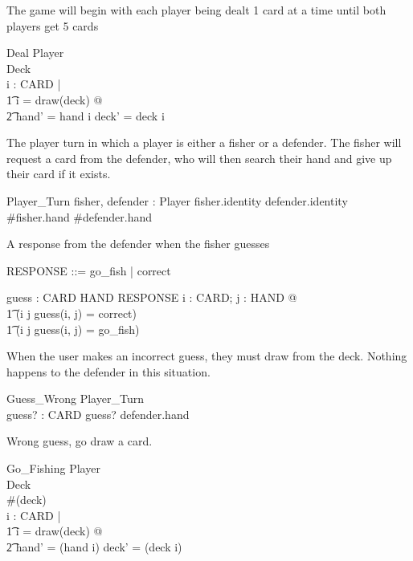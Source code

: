 \documentclass{article}
\begin{document}
The game will begin with each player being dealt 1 card at a time
until both players get 5 cards
\begin{schema}{Deal}
    \Delta Player \\
    \Delta Deck \\
    \where
    \forall i : \power CARD | \\
    \t1 i = draw(deck) @ \\
    \t2 hand' = hand \cup i \land deck' = deck \setminus i
\end{schema}

The player turn in which a player is either a fisher
or a defender. The fisher will request a card from the defender,
who will then search their hand and give up their card if it exists.
\begin{schema}{Player\_Turn}
    fisher, defender : Player
    \where
    fisher.identity \neq defender.identity\\
    \#fisher.hand  \land \#defender.hand 
\end{schema}

A response from the defender when the fisher guesses
\begin{zed}
RESPONSE ::= go\_fish | correct
\end{zed}

\begin{axdef}
    guess : CARD \cross HAND \fun RESPONSE
    \where
    \forall i : CARD; j : HAND @ \\
    \t1 (i \in j \iff guess(i, j) = correct) \lor \\
    \t1 (i \notin j \iff guess(i, j) = go\_fish)
\end{axdef}

When the user makes an incorrect guess, they must draw from
the deck. Nothing happens to the defender in this situation.
\begin{schema}{Guess\_Wrong}
    \Xi Player\_Turn \\
    guess? : CARD 
    \where
    guess? \notin defender.hand \\
\end{schema}

Wrong guess, go draw a card.
\begin{schema}{Go\_Fishing}
    \Delta Player\\
    \Delta Deck \\
    \where
    \#(deck)  \\
    \forall i : \power CARD | \\
    \t1 i = draw(deck) @ \\
    \t2 hand' = (hand \cup i) \land deck' = (deck \setminus i) \\
\end{schema}
 
\end{document}
